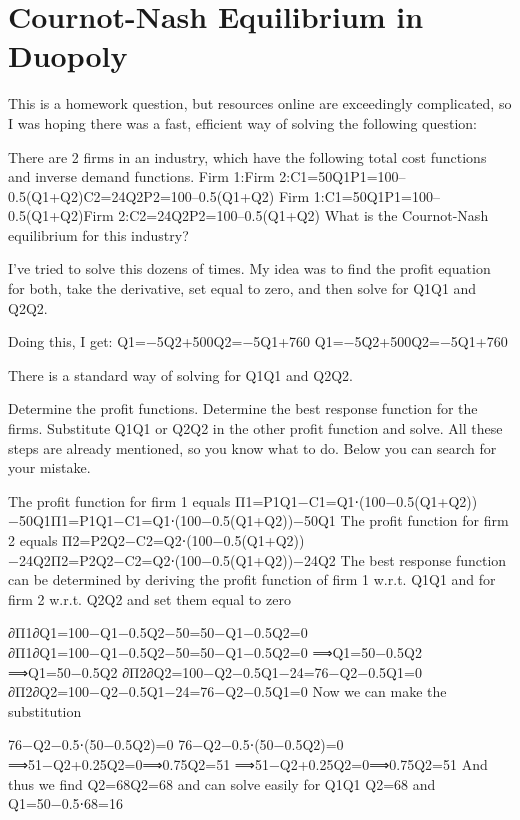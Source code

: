 \section{Cournot-Nash Equilibrium in Duopoly}

This is a homework question, but resources online are exceedingly complicated, so I was hoping there was a fast, efficient way of solving the following question:

There are 2 firms in an industry, which have the following total cost functions and inverse demand functions.
Firm 1:Firm 2:C1=50Q1P1=100–0.5(Q1+Q2)C2=24Q2P2=100–0.5(Q1+Q2)
Firm 1:C1=50Q1P1=100–0.5(Q1+Q2)Firm 2:C2=24Q2P2=100–0.5(Q1+Q2)
What is the Cournot-Nash equilibrium for this industry?

I've tried to solve this dozens of times. My idea was to find the profit equation for both, take the derivative, set equal to zero, and then solve for Q1Q1 and Q2Q2.

Doing this, I get:
Q1=−5Q2+500Q2=−5Q1+760
Q1=−5Q2+500Q2=−5Q1+760



There is a standard way of solving for Q1Q1 and Q2Q2.

Determine the profit functions.
Determine the best response function for the firms.
Substitute Q1Q1 or Q2Q2 in the other profit function and solve.
All these steps are already mentioned, so you know what to do. Below you can search for your mistake.

The profit function for firm 1 equals Π1=P1Q1−C1=Q1⋅(100−0.5(Q1+Q2))−50Q1Π1=P1Q1−C1=Q1⋅(100−0.5(Q1+Q2))−50Q1
The profit function for firm 2 equals Π2=P2Q2−C2=Q2⋅(100−0.5(Q1+Q2))−24Q2Π2=P2Q2−C2=Q2⋅(100−0.5(Q1+Q2))−24Q2
The best response function can be determined by deriving the profit function of firm 1 w.r.t. Q1Q1 and for firm 2 w.r.t. Q2Q2 and set them equal to zero

∂Π1∂Q1=100−Q1−0.5Q2−50=50−Q1−0.5Q2=0
∂Π1∂Q1=100−Q1−0.5Q2−50=50−Q1−0.5Q2=0
⟹Q1=50−0.5Q2
⟹Q1=50−0.5Q2
∂Π2∂Q2=100−Q2−0.5Q1−24=76−Q2−0.5Q1=0
∂Π2∂Q2=100−Q2−0.5Q1−24=76−Q2−0.5Q1=0
Now we can make the substitution

76−Q2−0.5⋅(50−0.5Q2)=0
76−Q2−0.5⋅(50−0.5Q2)=0
⟹51−Q2+0.25Q2=0⟹0.75Q2=51
⟹51−Q2+0.25Q2=0⟹0.75Q2=51
And thus we find Q2=68Q2=68 and can solve easily for Q1Q1
Q2=68 and Q1=50−0.5⋅68=16


